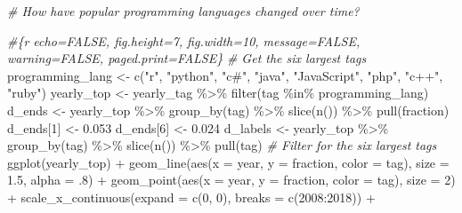 \documentclass[
]{article}
\newenvironment{Shaded}{\begin{snugshade}}{\end{snugshade}}
\newcommand{\AttributeTok}[1]{\textcolor[rgb]{0.77,0.63,0.00}{#1}}
\newcommand{\CommentTok}[1]{\textcolor[rgb]{0.56,0.35,0.01}{\textit{#1}}}
\newcommand{\DecValTok}[1]{\textcolor[rgb]{0.00,0.00,0.81}{#1}}
\newcommand{\FloatTok}[1]{\textcolor[rgb]{0.00,0.00,0.81}{#1}}
\newcommand{\FunctionTok}[1]{\textcolor[rgb]{0.00,0.00,0.00}{#1}}
\newcommand{\NormalTok}[1]{#1}
\newcommand{\OtherTok}[1]{\textcolor[rgb]{0.56,0.35,0.01}{#1}}
\newcommand{\SpecialCharTok}[1]{\textcolor[rgb]{0.00,0.00,0.00}{#1}}
\newcommand{\StringTok}[1]{\textcolor[rgb]{0.31,0.60,0.02}{#1}}
\begin{document}
\begin{Shaded}
\begin{Highlighting}[]
\CommentTok{\# How have popular programming languages changed over time?}

\CommentTok{\#\{r echo=FALSE, fig.height=7, fig.width=10, message=FALSE, warning=FALSE, paged.print=FALSE\}}
\CommentTok{\# Get the six largest tags}
\NormalTok{programming\_lang }\OtherTok{\textless{}{-}} \FunctionTok{c}\NormalTok{(}\StringTok{"r"}\NormalTok{, }\StringTok{"python"}\NormalTok{, }\StringTok{"c\#"}\NormalTok{, }\StringTok{"java"}\NormalTok{, }\StringTok{"JavaScript"}\NormalTok{, }\StringTok{"php"}\NormalTok{, }\StringTok{"c++"}\NormalTok{, }\StringTok{"ruby"}\NormalTok{)}
\NormalTok{yearly\_top }\OtherTok{\textless{}{-}} 
\NormalTok{  yearly\_tag }\SpecialCharTok{\%\textgreater{}\%} 
  \FunctionTok{filter}\NormalTok{(tag }\SpecialCharTok{\%in\%}\NormalTok{ programming\_lang)}
\NormalTok{d\_ends }\OtherTok{\textless{}{-}} 
\NormalTok{  yearly\_top }\SpecialCharTok{\%\textgreater{}\%} 
  \FunctionTok{group\_by}\NormalTok{(tag) }\SpecialCharTok{\%\textgreater{}\%} 
  \FunctionTok{slice}\NormalTok{(}\FunctionTok{n}\NormalTok{()) }\SpecialCharTok{\%\textgreater{}\%} 
  \FunctionTok{pull}\NormalTok{(fraction)}
\NormalTok{d\_ends[}\DecValTok{1}\NormalTok{] }\OtherTok{\textless{}{-}} \FloatTok{0.053}
\NormalTok{d\_ends[}\DecValTok{6}\NormalTok{] }\OtherTok{\textless{}{-}} \FloatTok{0.024}
\NormalTok{d\_labels }\OtherTok{\textless{}{-}} 
\NormalTok{  yearly\_top }\SpecialCharTok{\%\textgreater{}\%} 
  \FunctionTok{group\_by}\NormalTok{(tag) }\SpecialCharTok{\%\textgreater{}\%} 
  \FunctionTok{slice}\NormalTok{(}\FunctionTok{n}\NormalTok{()) }\SpecialCharTok{\%\textgreater{}\%} 
  \FunctionTok{pull}\NormalTok{(tag)}
\CommentTok{\# Filter for the six largest tags}
\FunctionTok{ggplot}\NormalTok{(yearly\_top) }\SpecialCharTok{+}
  \FunctionTok{geom\_line}\NormalTok{(}\FunctionTok{aes}\NormalTok{(}\AttributeTok{x =}\NormalTok{ year, }\AttributeTok{y =}\NormalTok{ fraction, }\AttributeTok{color =}\NormalTok{ tag), }\AttributeTok{size =} \FloatTok{1.5}\NormalTok{, }\AttributeTok{alpha =}\NormalTok{ .}\DecValTok{8}\NormalTok{) }\SpecialCharTok{+}
  \FunctionTok{geom\_point}\NormalTok{(}\FunctionTok{aes}\NormalTok{(}\AttributeTok{x =}\NormalTok{ year, }\AttributeTok{y =}\NormalTok{ fraction, }\AttributeTok{color =}\NormalTok{ tag), }\AttributeTok{size =} \DecValTok{2}\NormalTok{) }\SpecialCharTok{+}
  \FunctionTok{scale\_x\_continuous}\NormalTok{(}\AttributeTok{expand =} \FunctionTok{c}\NormalTok{(}\DecValTok{0}\NormalTok{, }\DecValTok{0}\NormalTok{), }\AttributeTok{breaks =} \FunctionTok{c}\NormalTok{(}\DecValTok{2008}\SpecialCharTok{:}\DecValTok{2018}\NormalTok{)) }\SpecialCharTok{+}

\end{Highlighting}
\end{Shaded}
\end{document}
